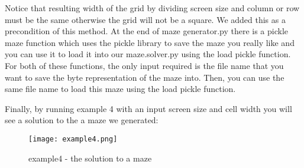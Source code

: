 \documentclass[fontsize=11pt]{article}
\begin{document}
Notice that resulting width of the grid by dividing screen size and column or row must be the same otherwise the grid will not be a square. We added this as a precondition of this method. At the end of maze generator.py there is a pickle maze function which uses the pickle library to save the maze you really like and you can use it to load it into our maze.solver.py using the load pickle function. For both of these functions, the only input required is the file name that you want to save the byte representation of the maze into. Then, you can use the same file name to load this maze using the load pickle function.

Finally, by running example 4 with an input screen size and cell width you will see a solution to the a maze we generated:
\begin{figure}[ht]
\centering
\texttt{[image: example4.png]}
\caption{example4 - the solution to a maze}
\label{fig:label}
\end{figure}


\newpage
\end{document}
